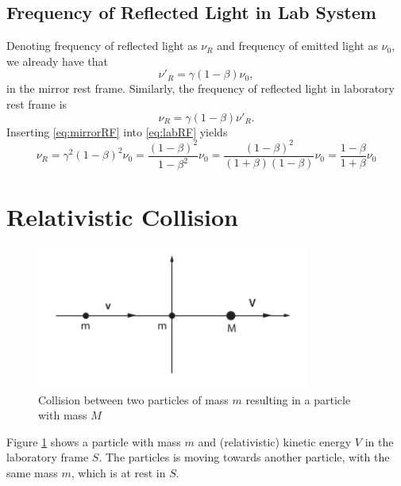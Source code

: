 \documentclass[11pt]{amsart}
\begin{document}
\subsection{Frequency of Reflected Light in Lab System}

Denoting frequency of reflected light as $\nu_R$ and frequency of emitted light as $\nu_0$, we already have that
\begin{equation}
\label{eq:mirrorRF}
\nu'_R = \gamma(1-\beta)\nu_0,
\end{equation}
in the mirror rest frame. Similarly, the frequency of reflected light in laboratory rest frame is
\begin{equation}
\label{eq:labRF}
\nu_R = \gamma(1-\beta)\nu'_R.
\end{equation}
Inserting \ref{eq:mirrorRF} into \ref{eq:labRF} yields
\begin{equation}
\nu_R = \gamma^2(1-\beta)^2\nu_0 = \frac{(1-\beta)^2}{1-\beta^2}\nu_0 = \frac{(1-\beta)^2}{(1+\beta)(1-\beta)}\nu_0 = \frac{1-\beta}{1+\beta}\nu_0
\end{equation}

\section{Relativistic Collision}
\begin{figure}
\centering
	\includegraphics[width=0.8\textwidth]{collision.png}
	\caption{Collision between two particles of mass $m$ resulting in a particle with mass $M$}
	\label{fig:collision}
\end{figure}

Figure \ref{fig:collision} shows a particle with mass $m$ and (relativistic) kinetic energy $V$ in the laboratory frame $S$. The particles is moving towards another particle, with the same mass $m$, which is at rest in $S$.
\end{document}
